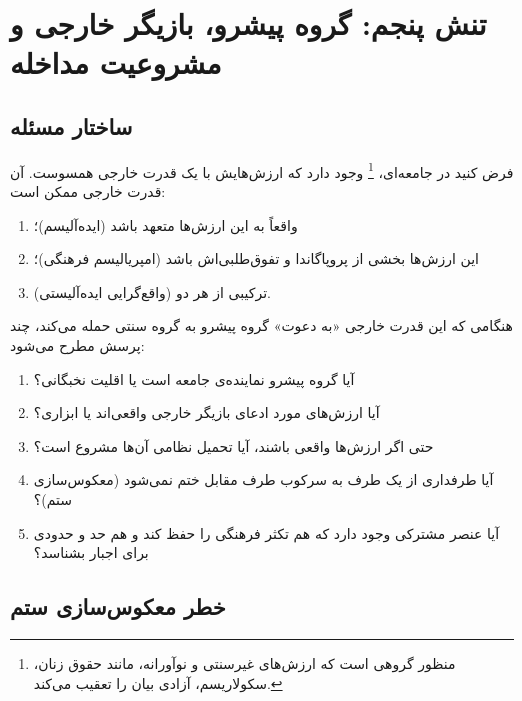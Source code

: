 \section{تنش پنجم: گروه پیشرو، بازیگر خارجی و مشروعیت مداخله}
\label{sec:ch02-tension5}

\subsection{ساختار مسئله}
\label{subsec:ch02-t5-structure}

فرض کنید در جامعه‌ای، %
\footnote{منظور گروهی است که ارزش‌های غیرسنتی و نوآورانه، مانند
	حقوق زنان، سکولاریسم، آزادی بیان را تعقیب می‌کند.}%
وجود دارد که ارزش‌هایش با یک قدرت خارجی همسوست. آن قدرت خارجی
ممکن است:

\begin{enumerate}[label=\textbf{\alph*.}, nosep, rightmargin=1em]
	\item واقعاً به این ارزش‌ها متعهد باشد (ایده‌آلیسم)؛
	\item این ارزش‌ها بخشی از پروپاگاندا و تفوق‌طلبی‌اش باشد
	(امپریالیسم فرهنگی)؛
	\item ترکیبی از هر دو (واقع‌گرایی ایده‌آلیستی).
\end{enumerate}

هنگامی که این قدرت خارجی «به دعوت» گروه پیشرو به گروه سنتی حمله
می‌کند، چند پرسش مطرح می‌شود:

\begin{tcolorbox}[mybox, title={پرسش‌های کلیدی تنش پنجم}]
	\begin{enumerate}[label=\textbf{\arabic*.}, nosep, rightmargin=1em]
		\item آیا گروه پیشرو نماینده‌ی جامعه است یا اقلیت نخبگانی؟
		\item آیا ارزش‌های مورد ادعای بازیگر خارجی واقعی‌اند یا ابزاری؟
		\item حتی اگر ارزش‌ها واقعی باشند، آیا تحمیل نظامی آن‌ها
		مشروع است؟
		\item آیا طرفداری از یک طرف به سرکوب طرف مقابل ختم نمی‌شود
		(معکوس‌سازی ستم)؟
		\item آیا عنصر مشترکی وجود دارد که هم تکثر فرهنگی را حفظ کند
		و هم حد و حدودی برای اجبار بشناسد؟
	\end{enumerate}
\end{tcolorbox}

\subsection{خطر معکوس‌سازی ستم}
\label{subsec:ch02-t5-reversal}

